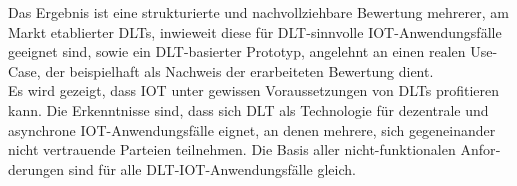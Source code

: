 \begin{otherlanguage}{ngerman}
	Das Ergebnis ist eine strukturierte und nachvollziehbare Bewertung mehrerer, am Markt etablierter \acp{DLT}, inwieweit diese für \ac{DLT}-sinnvolle \ac{IOT}-Anwendungsfälle geeignet sind, sowie ein \ac{DLT}-basierter Prototyp, angelehnt an einen realen Use-Case, der beispielhaft als Nachweis der erarbeiteten Bewertung dient.\\
	Es wird gezeigt, dass \ac{IOT} unter gewissen Voraussetzungen von \acp{DLT} profitieren kann. Die Erkenntnisse sind, dass sich \ac{DLT} als Technologie für dezentrale und asynchrone \ac{IOT}-Anwendungsfälle eignet, an denen mehrere, sich gegeneinander nicht vertrauende Parteien teilnehmen. Die Basis aller nicht-funktionalen Anforderungen sind für alle \ac{DLT}-\ac{IOT}-Anwendungsfälle gleich.
\end{otherlanguage}
